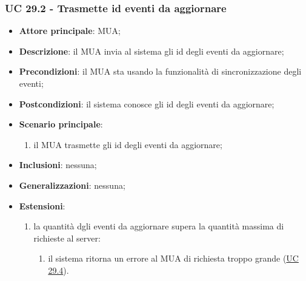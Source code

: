     \subsubsection{UC 29.2 - Trasmette id eventi da aggiornare} \label{sec:UC29.2}
    \begin{itemize}
        \item \textbf{Attore principale}: MUA;
        \item \textbf{Descrizione}: il MUA invia al sistema gli id degli eventi da aggiornare;
        \item \textbf{Precondizioni}: il MUA sta usando la funzionalità di sincronizzazione degli eventi;
        \item \textbf{Postcondizioni}: il sistema conosce gli id degli eventi da aggiornare;
        \item \textbf{Scenario principale}:
            \begin{enumerate}
                \item il MUA trasmette gli id degli eventi da aggiornare;
            \end{enumerate}
        \item \textbf{Inclusioni}: nessuna;
        \item \textbf{Generalizzazioni}: nessuna;
        \item \textbf{Estensioni}:
            \begin{enumerate}[label=\alph*.]
                \item la quantità dgli eventi da aggiornare supera la quantità massima di richieste al server:
                \begin{enumerate}[label=\arabic*.]
                    \item il sistema ritorna un errore al MUA di richiesta troppo grande (\hyperref[sec:UC29.4]{UC 29.4}).
                \end{enumerate}
            \end{enumerate}
    \end{itemize}


